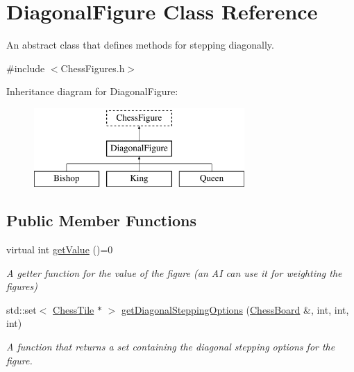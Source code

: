 \hypertarget{classDiagonalFigure}{}\section{Diagonal\+Figure Class Reference}
\label{classDiagonalFigure}


An abstract class that defines methods for stepping diagonally.  




{\ttfamily \#include $<$Chess\+Figures.\+h$>$}

Inheritance diagram for Diagonal\+Figure\+:\begin{figure}[H]
\begin{center}
\leavevmode
\includegraphics[height=3.000000cm]{classDiagonalFigure}
\end{center}
\end{figure}
\subsection*{Public Member Functions}
\begin{DoxyCompactItemize}
\item 
\mbox{\label{classDiagonalFigure_a6fee4161066f638dda40b16d0096487d}} 
virtual int \mbox{\hyperlink{classDiagonalFigure_a6fee4161066f638dda40b16d0096487d}{get\+Value}} ()=0
\begin{DoxyCompactList}\small\item\em A getter function for the value of the figure (an AI can use it for weighting the figures) \end{DoxyCompactList}\item 
std\+::set$<$ \mbox{\hyperlink{classChessTile}{Chess\+Tile}} $\ast$ $>$ \mbox{\hyperlink{classDiagonalFigure_a95b5c28c86337d7d6b034aadd09c9d2b}{get\+Diagonal\+Stepping\+Options}} (\mbox{\hyperlink{classChessBoard}{Chess\+Board}} \&, int, int, int)
\begin{DoxyCompactList}\small\item\em A function that returns a set containing the diagonal stepping options for the figure. \end{DoxyCompactList}\end{DoxyCompactItemize}
